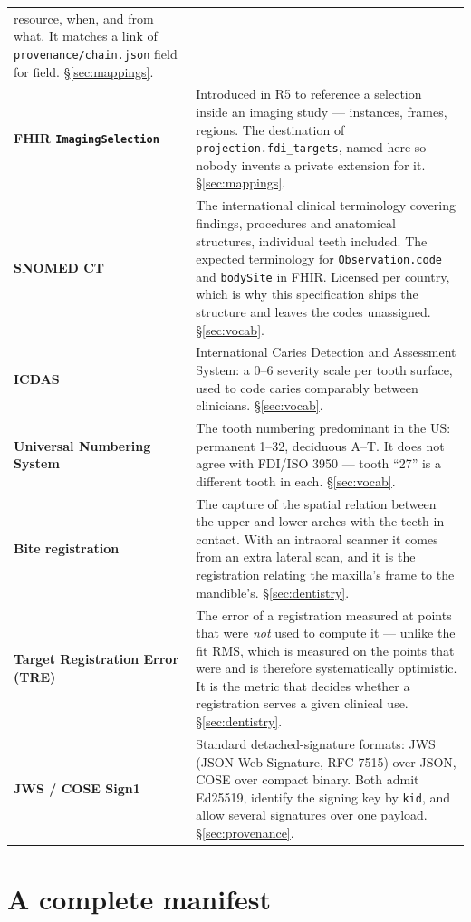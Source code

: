 \documentclass[11pt,a4paper]{article}
\newcommand{\code}[1]{\texttt{\small #1}}
\begin{document}
\begin{longtable}{L{4.3cm} L{11.1cm}}
resource, when, and from what. It matches a link of \code{provenance/chain.json} field for
field. \S\ref{sec:mappings}.\\
\textbf{FHIR \code{ImagingSelection}} & Introduced in R5 to reference a selection inside an
imaging study --- instances, frames, regions. The destination of
\code{projection.fdi\_targets}, named here so nobody invents a private extension for it.
\S\ref{sec:mappings}.\\
\textbf{SNOMED CT} & The international clinical terminology covering findings, procedures
and anatomical structures, individual teeth included. The expected terminology for
\code{Observation.code} and \code{bodySite} in FHIR. Licensed per country, which is why
this specification ships the structure and leaves the codes unassigned.
\S\ref{sec:vocab}.\\
\textbf{ICDAS} & International Caries Detection and Assessment System: a 0--6 severity
scale per tooth surface, used to code caries comparably between clinicians.
\S\ref{sec:vocab}.\\
\textbf{Universal Numbering System} & The tooth numbering predominant in the US: permanent
1--32, deciduous A--T. It does not agree with FDI/ISO 3950 --- tooth ``27'' is a different
tooth in each. \S\ref{sec:vocab}.\\
\textbf{Bite registration} & The capture of the spatial relation between the upper and
lower arches with the teeth in contact. With an intraoral scanner it comes from an extra
lateral scan, and it is the registration relating the maxilla's frame to the mandible's.
\S\ref{sec:dentistry}.\\
\textbf{Target Registration Error (TRE)} & The error of a registration measured at points
that were \emph{not} used to compute it --- unlike the fit RMS, which is measured on the
points that were and is therefore systematically optimistic. It is the metric that decides
whether a registration serves a given clinical use. \S\ref{sec:dentistry}.\\
\textbf{JWS / COSE Sign1} & Standard detached-signature formats: JWS (JSON Web Signature,
RFC 7515) over JSON, COSE over compact binary. Both admit Ed25519, identify the signing key
by \code{kid}, and allow several signatures over one payload.
\S\ref{sec:provenance}.\\
\bottomrule
\end{longtable}

\newpage
\section{A complete manifest}\label{app:manifest}
\end{document}
